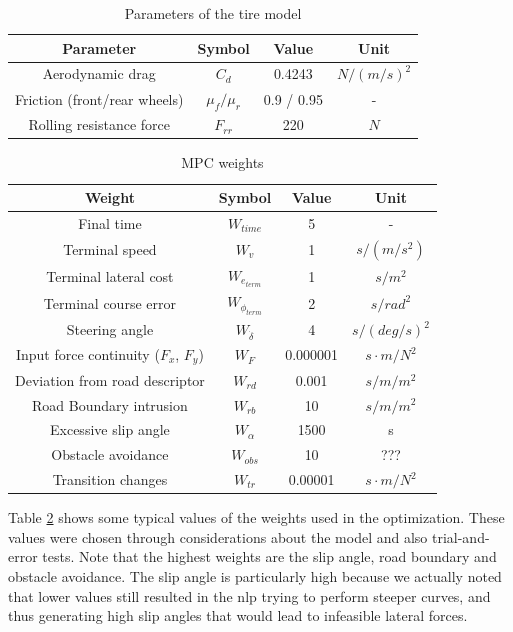 \documentclass[a4paper, onecolumn, 12pt]{article}
\begin{document}
\begin{table}[H]
    \centering
    \caption{Parameters of the tire model} \label{env_params}
    \begin{tabular}{ |c|c|c|c| }
        \hline
        \textbf{Parameter} & \textbf{Symbol} & \textbf{Value} & \textbf{Unit} \\ [0.5ex] 
        \hline
        \hline 
        Aerodynamic drag & $C_d$ & 0.4243 & $N/(m/s)^2$ \\
        \hline
        Friction (front/rear wheels) & $\mu_f/\mu_r$ & 0.9 / 0.95 & - \\
        \hline
        Rolling resistance force & $F_{rr}$ & 220 & $N$ \\
        \hline

    \end{tabular}
\end{table}


\begin{table}[H] 
    \centering
    \caption{MPC weights} \label{weights}
    \begin{tabular}{ |c|c|c|c| }
        \hline
        \textbf{Weight} & \textbf{Symbol} & \textbf{Value} & \textbf{Unit} \\ [0.5ex] 
        \hline
        \hline
        Final time & $W_{time}$ & 5 & -\\ 
        \hline
        Terminal speed & $W_{v}$ & 1 & $s/(m/s^2)$\\
        \hline
        Terminal lateral cost & $W_{e_{term}}$ & 1 & $s/m^2$ \\
        \hline
        Terminal course error & $W_{\phi_{term}}$ & 2 & $s/rad^2$ \\
        \hline
        Steering angle & $W_{\dot{\delta}}$ & 4 & $s/(deg/s)^2$ \\
        \hline 
        Input force continuity ($F_x$, $F_y$) & $W_{F}$ & 0.000001 & $s \cdot m / N^2$ \\
        \hline
        Deviation from road descriptor & $W_{rd}$ & 0.001 & $s/m/m^2$ \\
        \hline
        Road Boundary intrusion & $W_{rb}$ & 10 & $s/m/m^2$ \\
        \hline
        Excessive slip angle & $W_\alpha$ & 1500 & s \\
        \hline
        Obstacle avoidance & $W_{obs}$ & 10 & ??? \\
        \hline
        Transition changes & $W_{tr}$ & 0.00001 & $s \cdot m / N^2$ \\
        \hline
    \end{tabular}
\end{table}
Table \ref{weights} shows some typical values of the weights used in the
optimization. These values were chosen through considerations about the model
and also trial-and-error tests. Note that the highest weights are the slip
angle, road boundary and obstacle avoidance. The slip angle is particularly high
because we actually noted that lower values still resulted in the nlp trying to
perform steeper curves, and thus generating high slip angles that would lead to
infeasible lateral forces. 
\end{document}
